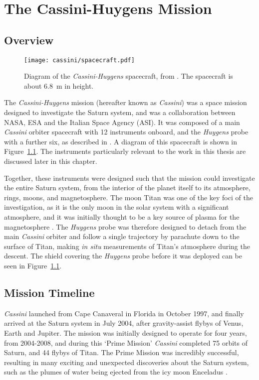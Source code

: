 \chapter{The Cassini-Huygens Mission}
\label{chap:cassini}
\section{Overview}
\begin{figure}
\centering
\noindent\texttt{[image: cassini/spacecraft.pdf]}
\caption[Diagram of the \textit{Cassini-Huygens} spacecraft]{Diagram of the \textit{Cassini-Huygens} spacecraft, from \citet{narvaez2004}. The spacecraft is about \SI{6.8}{m} in height.}
\label{cassini:fig:spacecraft}
\end{figure}

The \textit{Cassini-Huygens} mission (hereafter known as \textit{Cassini}) was a space mission designed to investigate the Saturn system, and was a collaboration between NASA, ESA and the Italian Space Agency (ASI). It was composed of a main \textit{Cassini} orbiter spacecraft with 12 instruments onboard, and the \textit{Huygens} probe with a further six, as described in \citet{matson2002}. A diagram of this spacecraft is shown in Figure~\ref{cassini:fig:spacecraft}. The instruments particularly relevant to the work in this thesis are discussed later in this chapter. 

Together, these instruments were designed such that the mission could investigate the entire Saturn system, from the interior of the planet itself to its atmosphere, rings, moons, and magnetosphere. The moon Titan was one of the key foci of the investigation, as it is the only moon in the solar system with a significant atmosphere, and it was initially thought to be a key source of plasma for the magnetosphere \citep{smith2004}. The \textit{Huygens} probe was therefore designed to detach from the main \textit{Cassini} orbiter and follow a single trajectory by parachute down to the surface of Titan, making \textit{in situ} measurements of Titan's atmosphere during the descent. The shield covering the \textit{Huygens} probe before it was deployed can be seen in Figure~\ref{cassini:fig:spacecraft}.

\section{Mission Timeline}\label{cassini:sec:timeline}
\textit{Cassini} launched from Cape Canaveral in Florida in October 1997, and finally arrived at the Saturn system in July 2004, after gravity-assist flybys of Venus, Earth and Jupiter. The mission was initially designed to operate for four years, from 2004-2008, and during this `Prime Mission' \textit{Cassini} completed 75 orbits of Saturn, and 44 flybys of Titan. The Prime Mission was incredibly successful, resulting in many exciting and unexpected discoveries about the Saturn system, such as the plumes of water being ejected from the icy moon Enceladus \citep{dougherty2006}. 

